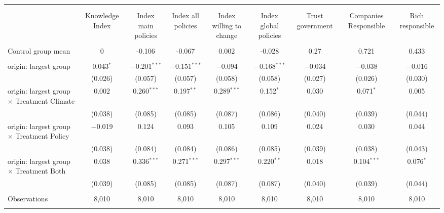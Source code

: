 
\begin{tabular}{@{\extracolsep{5pt}}lcccccccc} 
\\[-1.8ex]\hline 
\hline \\[-1.8ex] 
\\[-1.8ex] & Knowledge Index & Index main policies & Index all policies & Index willing to change & Index global policies & Trust government & Companies Responsible & Rich responsible \\ 
\hline \\[-1.8ex] 
 Control group mean & 0 & -0.106 & -0.067 & 0.002 & -0.028 & 0.27 & 0.721 & 0.433  \\ \hline \\[-1.8ex] origin: largest group & 0.043$^{*}$ & $-$0.201$^{***}$ & $-$0.151$^{***}$ & $-$0.094 & $-$0.168$^{***}$ & $-$0.034 & $-$0.038 & $-$0.016 \\ 
  & (0.026) & (0.057) & (0.057) & (0.058) & (0.058) & (0.027) & (0.026) & (0.030) \\ 
 origin: largest group $\times$ Treatment Climate & 0.002 & 0.260$^{***}$ & 0.197$^{**}$ & 0.289$^{***}$ & 0.152$^{*}$ & 0.030 & 0.071$^{*}$ & 0.005 \\ 
  & (0.038) & (0.085) & (0.085) & (0.087) & (0.086) & (0.040) & (0.039) & (0.044) \\ 
 origin: largest group $\times$ Treatment Policy & $-$0.019 & 0.124 & 0.093 & 0.105 & 0.109 & 0.024 & 0.030 & 0.044 \\ 
  & (0.038) & (0.084) & (0.084) & (0.086) & (0.085) & (0.039) & (0.038) & (0.043) \\ 
 origin: largest group $\times$ Treatment Both & 0.038 & 0.336$^{***}$ & 0.271$^{***}$ & 0.297$^{***}$ & 0.220$^{**}$ & 0.018 & 0.104$^{***}$ & 0.076$^{*}$ \\ 
  & (0.039) & (0.085) & (0.085) & (0.087) & (0.087) & (0.040) & (0.039) & (0.044) \\ 
\hline \\[-1.8ex] 

Observations & 8,010 & 8,010 & 8,010 & 8,010 & 8,010 & 8,010 & 8,010 & 8,010 \\ 
\hline 
\hline \\[-1.8ex] 
\end{tabular} 